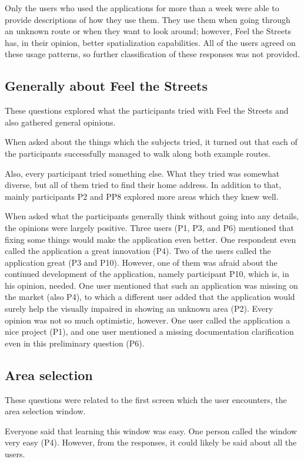 \documentclass[nolof,digital]{fithesis3}
\begin{document}
Only the users who used the applications for more than a week were able to provide descriptions of how they use them. They use them when going through an unknown route or when they want to look around; however, Feel the Streets has, in their opinion, better spatialization capabilities. All of the users agreed on these usage patterns, so further classification of these responses was not provided.
\subsection{Generally about Feel the Streets}
These questions explored what the participants tried with Feel the Streets and also gathered general opinions.

When asked about the things which the subjects tried, it turned out that each of the participants successfully managed to walk along both example routes.

Also, every participant tried something else. What they tried was somewhat diverse, but all of them tried to find their home address. In addition to that, mainly participants P2 and PP8 explored more areas which they knew well.

When asked what the participants generally think without going into any details, the opinions were largely positive. Three users (P1, P3, and P6) mentioned that fixing some things would make the application even better. One respondent even called the application a great innovation (P4). Two of the users called the application great (P3 and P10). However, one of them was afraid about the continued development of the application, namely participant P10,  which is, in his opinion, needed. One user mentioned that such an application was missing on the market (also P4), to which a different user added that the application would surely help the visually impaired in showing an unknown area (P2). Every opinion was not so much optimistic, however. One user called the application a nice project (P1), and one user mentioned a missing documentation clarification even in this preliminary question (P6).
\subsection{Area selection}
These questions were related to the first screen which the user encounters, the area selection window.

Everyone said that learning this window was easy. One person called the window very easy (P4). However, from the responses, it could likely be said about all the users.
\end{document}
